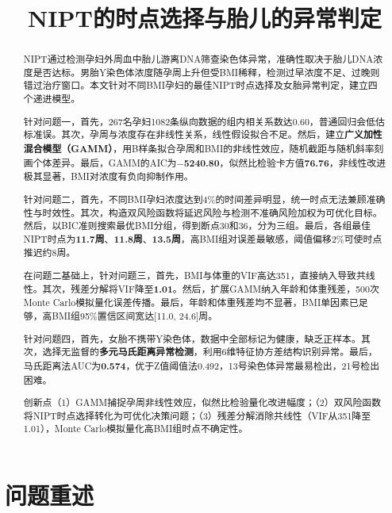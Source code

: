 \documentclass[withoutpreface]{cumcmthesis}
\title{NIPT的时点选择与胎儿的异常判定}
\begin{document}
\maketitle

\begin{abstract}

NIPT通过检测孕妇外周血中胎儿游离DNA筛查染色体异常，准确性取决于胎儿DNA浓度是否达标。男胎Y染色体浓度随孕周上升但受BMI稀释，检测过早浓度不足、过晚则错过治疗窗口。本文针对不同BMI孕妇的最佳NIPT时点选择及女胎异常判定，建立四个递进模型。

针对问题一，首先，267名孕妇1082条纵向数据的组内相关系数达0.60，普通回归会低估标准误。其次，孕周与浓度存在非线性关系，线性假设拟合不足。然后，建立\textbf{广义加性混合模型（GAMM）}，用B样条拟合孕周和BMI的非线性效应，随机截距与随机斜率刻画个体差异。最后，GAMM的AIC为\textbf{$-$5240.80}，似然比检验卡方值\textbf{76.76}，非线性改进极其显著，BMI对浓度有负向抑制作用。

针对问题二，首先，不同BMI孕妇浓度达到4\%的时间差异明显，统一时点无法兼顾准确性与时效性。其次，构造双风险函数将延迟风险与检测不准确风险加权为可优化目标。然后，以BIC准则搜索最优BMI分组，得到断点30和36，分为三组。最后，各组最佳NIPT时点为\textbf{11.7周}、\textbf{11.8周}、\textbf{13.5周}，高BMI组对误差最敏感，阈值偏移2\%可使时点推迟约8周。

在问题二基础上，针对问题三，首先，BMI与体重的VIF高达351，直接纳入导致共线性。其次，残差分解将VIF降至\textbf{1.01}。然后，扩展GAMM纳入年龄和体重残差，500次Monte Carlo模拟量化误差传播。最后，年龄和体重残差均不显著，BMI单因素已足够，高BMI组95\%置信区间宽达[11.0, 24.6]周。

针对问题四，首先，女胎不携带Y染色体，数据中全部标记为健康，缺乏正样本。其次，选择无监督的\textbf{多元马氏距离异常检测}，利用6维特征协方差结构识别异常。最后，马氏距离法AUC为\textbf{0.574}，优于Z值阈值法0.492，13号染色体异常最易检出，21号检出困难。

创新点（1）GAMM捕捉孕周非线性效应，似然比检验量化改进幅度；（2）双风险函数将NIPT时点选择转化为可优化决策问题；（3）残差分解消除共线性（VIF从351降至1.01），Monte Carlo模拟量化高BMI组时点不确定性。


\end{abstract}

\section{问题重述}
\end{document}
